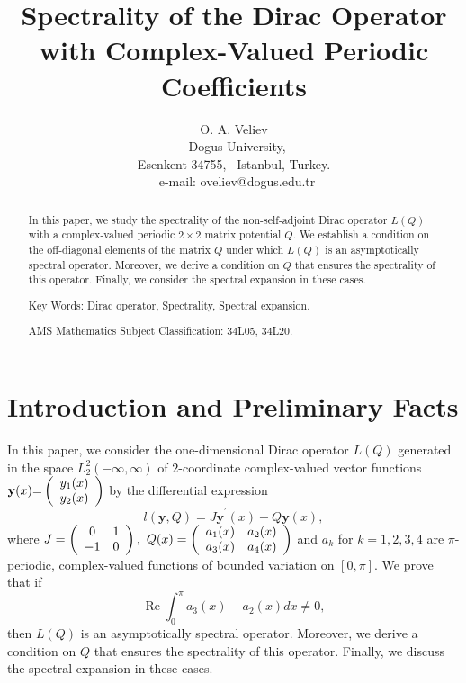 \documentclass{article}%
\begin{document}
\title{Spectrality of the Dirac Operator with Complex-Valued Periodic Coefficients}
\author{O. A. Veliev\\{\small \ Dogus University, }\\{\small Esenkent 34755, \ Istanbul, Turkey.}\\\ {\small e-mail: oveliev@dogus.edu.tr}}
\date{}
\maketitle

\begin{abstract}
In this paper, we study the spectrality of the non-self-adjoint Dirac operator
$L(Q)$ with a complex-valued periodic $2\times2$ matrix potential $Q.$ We
establish a condition on the off-diagonal elements of the matrix $Q$ under
which $L(Q)$ is an asymptotically spectral operator. Moreover, we derive a
condition on $Q$ that ensures the spectrality of this operator. Finally, we
consider the spectral expansion in these cases.

Key Words: Dirac operator, Spectrality, Spectral expansion.

AMS Mathematics Subject Classification: 34L05, 34L20.

\end{abstract}

\section{ Introduction and Preliminary Facts}

In this paper, we consider the one-dimensional Dirac operator $L(Q)$ generated
in the space $L_{2}^{2}(-\infty,\infty)$ of $2$-coordinate complex-valued
vector functions $\mathbf{y}(x)\mathbf{=}\left(
\begin{array}
[c]{c}%
y_{1}(x)\\
y_{2}(x)
\end{array}
\right)  $ by the differential expression
\begin{equation}
l(\mathbf{y,}Q)=J\mathbf{y}^{^{\prime}}(x)+Q\mathbf{y}(x), \tag{1}%
\end{equation}
where $J=\left(
\begin{array}
[c]{cc}%
0 & 1\\
-1 & 0
\end{array}
\right)  ,$ $Q(x)=\left(
\begin{array}
[c]{cc}%
a_{1}(x) & a_{2}(x)\\
a_{3}(x) & a_{4}(x)
\end{array}
\right)  $ and $a_{k}$ for $k=1,2,3,4$ are $\pi$-periodic, complex-valued
functions of bounded variation on $[0,\pi]$. We prove that if
\begin{equation}
\operatorname{Re}%
{\textstyle\int\nolimits_{0}^{\pi}}
a_{3}(x)-a_{2}(x)dx\neq0, \tag{2}%
\end{equation}
then $L(Q)$ is an asymptotically spectral operator. Moreover, we derive a
condition on $Q$ that ensures the spectrality of this operator. Finally, we
discuss the spectral expansion in these cases.
\end{document}
